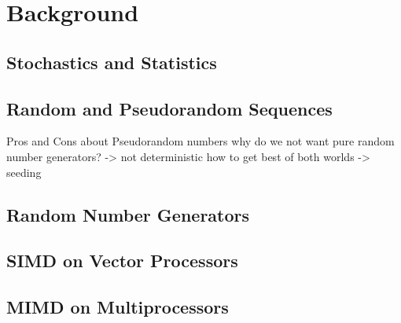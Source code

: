 \documentclass[crop=false]{standalone}
\begin{document}
  \section{Background} %
  \label{sec:background}
    \subsection{Stochastics and Statistics} %
    \label{sub:stochastics_and_statistics}


    \subsection{Random and Pseudorandom Sequences} %
    \label{sub:random_and_pseudorandom_sequences}
        Pros and Cons about Pseudorandom numbers
        why do we not want pure random number generators? -> not deterministic
        how to get best of both worlds -> seeding

    \subsection{Random Number Generators} %
    \label{sub:random_number_generators}


    \subsection{SIMD on Vector Processors} %
    \label{sub:vector_processors}


    \subsection{MIMD on Multiprocessors} %
    \label{sub:parallelization}

\end{document}
